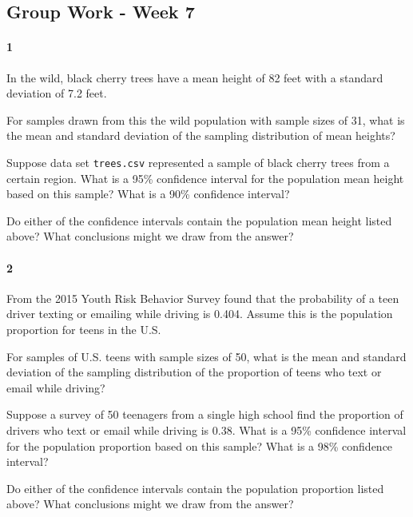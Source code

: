 \documentclass{article}
\begin{document}
\begin{flushleft}
\section*{Group Work - Week 7}
\paragraph{1} In the wild, black cherry trees have a mean height of 82 feet with a standard deviation of 7.2 feet. 
\begin{enumalpha}
\item For samples drawn from this the wild population with sample sizes of 31, what is the mean and standard deviation of the sampling distribution of mean heights?

\vspace{2in}
\item Suppose data set \verb+trees.csv+ represented a sample of black cherry trees from a certain region. What is a 95\% confidence interval for the population mean height based on this sample? What is a 90\% confidence interval? 

\vspace{2in}
\item Do either of the confidence intervals contain the population mean height listed above? What conclusions might we draw from the answer?
\end{enumalpha}

\newpage

\paragraph{2} From the 2015 Youth Risk Behavior Survey found that the probability of a teen driver texting or emailing while driving is 0.404. Assume this is the population proportion for teens in the U.S.

\begin{enumalpha}
\item For samples of U.S. teens with sample sizes of 50, what is the mean and standard deviation of the sampling distribution of the proportion of teens who text or email while driving?

\vspace{2in}
\item Suppose a survey of 50 teenagers from a single high school find the proportion of drivers who text or email while driving is 0.38. What is a 95\% confidence interval for the population proportion based on this sample? What is a 98\% confidence interval? 

\vspace{2in}
\item Do either of the confidence intervals contain the population proportion listed above? What conclusions might we draw from the answer?
\end{enumalpha}

\end{flushleft}
\end{document}

